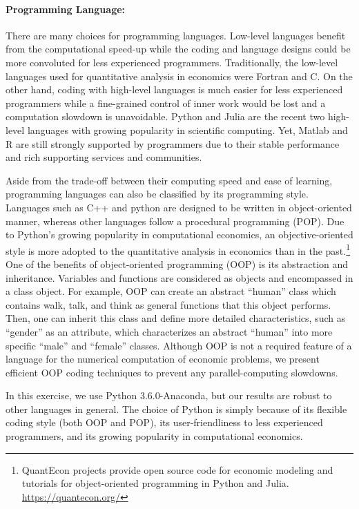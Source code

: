 \documentclass[12pt]{article}
\begin{document}
\paragraph{Programming Language:} There are many choices for programming languages. Low-level languages benefit from the computational speed-up while the coding and language designs could be more convoluted for less experienced programmers. Traditionally, the low-level languages used for quantitative analysis in economics were Fortran and C. On the other hand, coding with high-level languages is much easier for less experienced programmers while a fine-grained control of inner work would be lost and a computation slowdown is unavoidable. Python and Julia are the recent two high-level languages with growing popularity in scientific computing. Yet, Matlab and R are still strongly supported by programmers due to their stable performance and rich supporting services and communities. 

Aside from the trade-off between their computing speed and ease of learning, programming languages can also be classified by its programming style. Languages such as C++ and python are designed to be written in object-oriented manner, whereas other languages follow a procedural programming (POP). Due to Python's growing popularity in computational economics, an objective-oriented style is more adopted to the quantitative analysis in economics than in the past.\footnote{\sf QuantEcon projects provide open source code for economic modeling and tutorials for object-oriented programming in Python and Julia. \url{https://quantecon.org/}} One of the benefits of object-oriented programming (OOP) is its abstraction and inheritance. Variables and functions are considered as objects and encompassed in a class object. For example, OOP can create an abstract ``human'' class which contains walk, talk, and think as general functions that this object performs. Then, one can inherit this class and define more detailed characteristics, such as ``gender'' as an attribute, which characterizes an abstract ``human'' into more specific ``male'' and ``female'' classes. Although OOP is not a required feature of a language for the numerical computation of economic problems, we present efficient OOP coding techniques to prevent any parallel-computing slowdowns.

In this exercise, we use Python 3.6.0-Anaconda, but our results are robust to other languages in general. The choice of Python is simply because of its flexible coding style (both OOP and POP), its user-friendliness to less experienced programmers, and its growing popularity in computational economics.
\end{document}
